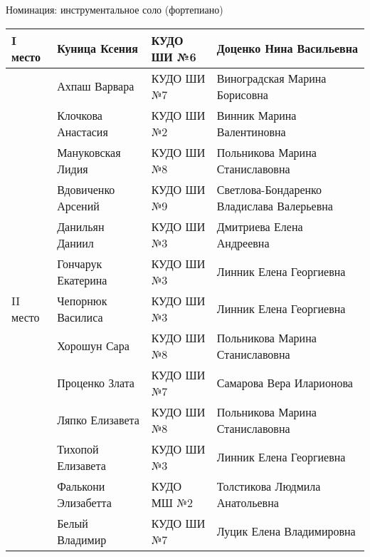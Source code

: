  
 
 
 
 

Номинация: инструментальное соло (фортепиано)

\begin{longtable}{|l|l|l|l|}
\hline I место   & Куница Ксения        & КУДО ШИ №6         & Доценко Нина Васильевна                   \\
\hline           & Ахпаш Варвара        & КУДО ШИ №7         & Виноградская Марина Борисовна             \\
\hline           & Клочкова Анастасия   & КУДО ШИ №2         & Винник Марина Валентиновна                \\
\hline           & Мануковская Лидия    & КУДО ШИ №8         & Польникова Марина Станиславовна           \\
\hline           & Вдовиченко Арсений   & КУДО ШИ №9         & Светлова-Бондаренко Владислава Валерьевна \\
\hline           & Данильян Даниил      & КУДО ШИ №3         & Дмитриева Елена Андреевна                 \\
\hline           & Гончарук Екатерина   & КУДО ШИ №3         & Линник Елена Георгиевна                   \\
\hline II место  & Чепорнюк Василиса    & КУДО ШИ №3         & Линник Елена Георгиевна                   \\
\hline           & Хорошун Сара         & КУДО ШИ №8         & Польникова Марина Станиславовна           \\
\hline           & Проценко Злата       & КУДО ШИ №7         & Самарова Вера Иларионова                  \\
\hline           & Ляпко Елизавета      & КУДО ШИ №8         & Польникова Марина Станиславовна           \\
\hline           & Тихопой Елизавета    & КУДО ШИ №3         & Линник Елена Георгиевна                   \\
\hline           & Фалькони Элизабетта  & КУДО МШ №2         & Толстикова Людмила Анатольевна            \\
\hline           & Белый Владимир       & КУДО ШИ №7         & Луцик Елена Владимировна                  \\

\end{longtable}
